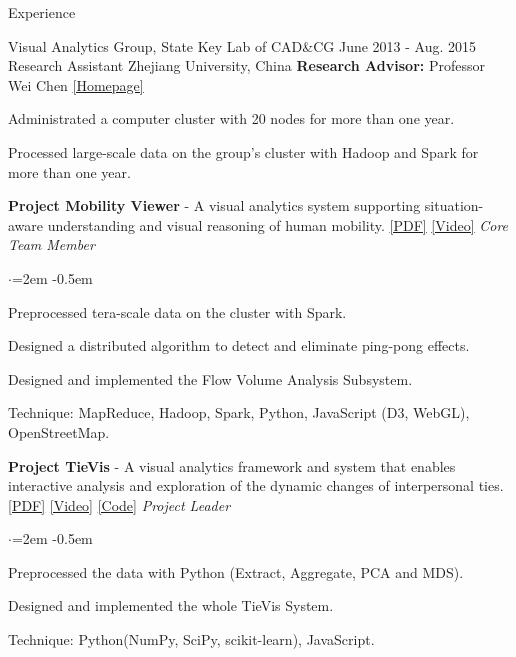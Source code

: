 \documentclass{resume} %
\begin{document}
\begin{rSection}{Experience}

\begin{rExperience}
	{Visual Analytics Group, State Key Lab of CAD\&CG}
	{June 2013 - Aug. 2015}
	{Research Assistant}
	{Zhejiang University, China}
	{{\bf Research Advisor:} Professor Wei Chen {\scriptsize {\href{http://www.cad.zju.edu.cn/home/chenwei/}{[Homepage]}}}}
\item Administrated a computer cluster with 20 nodes for more than one year.
\item Processed large-scale data on the group's cluster with Hadoop and Spark for more than one year.
\item {\bf Project Mobility Viewer} - A visual analytics system supporting situation-aware understanding and visual reasoning of human mobility. 
{\scriptsize \href{http://nblintao.github.io/pdf/Mobility\%20Viewer.pdf}{[PDF]}%
\href{https://youtu.be/m0HgyEsh0tI}{[Video]}}
\hfill {\em Core Team Member}

\begin{list}{$\cdot$}{\leftmargin=2em} %
	\itemsep -0.5em	\vspace{-0.5em} %
\item Preprocessed tera-scale data on the cluster with Spark.
\item Designed a distributed algorithm to detect and eliminate ping-pong effects.
\item Designed and implemented the Flow Volume Analysis Subsystem.
\item Technique: MapReduce, Hadoop, Spark, Python, JavaScript (D3, WebGL), OpenStreetMap.

\end{list}


\item {\bf Project TieVis} - A visual analytics framework and system that enables interactive analysis and exploration of the dynamic changes of interpersonal ties.
{\scriptsize \href{http://nblintao.github.io/pdf/TieVis.pdf}{[PDF]}
\href{https://youtu.be/xsr4YXOo1WA}{[Video]}
\href{https://github.com/nblintao/TieVis}{[Code]}}
\hfill {\em Project Leader}
\begin{list}{$\cdot$}{\leftmargin=2em} %
	\itemsep -0.5em	\vspace{-0.5em} %
	\item Preprocessed the data with Python (Extract, Aggregate, PCA and MDS).	
	\item Designed and implemented the whole TieVis System.
	\item Technique: Python(NumPy, SciPy, scikit-learn), JavaScript.
\end{list}



\end{rExperience}
\end{rSection}
\end{document}
